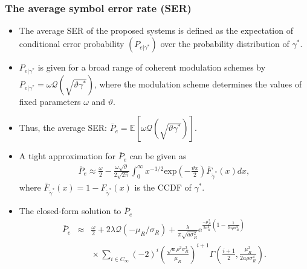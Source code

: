 \documentclass[article,mathserif,10pt,envcountsect]{beamer}
\newcommand{\E}[2][]{\mathbb{E}_{#1}\!\left[{#2}\right]}
\renewcommand{\exp}[1]{\mathrm{e}^{#1}}
\newcommand{\Exp}[1]{\mathrm{exp}\left(#1\right)}
\begin{document}
\begin{frame}
\frametitle{The average symbol error rate (SER)}
\begin{itemize}
	\item The average SER of the proposed systems is defined as the expectation of  conditional error probability $(P_{e|\gamma^*})$ over the  probability distribution of $\gamma^*$.
	
	\item  $P_{e|\gamma^*}$ is given for a broad range of coherent modulation schemes by $P_{e|\gamma^*} = \omega \mathcal{Q}\left(\sqrt{\vartheta \gamma^*}\right)$, where the modulation scheme determines the values of fixed  parameters $\omega$ and $\vartheta$.
	
	\item Thus, the average SER:  $\bar{P}_e= \E{\omega \mathcal{Q}\left(\sqrt{\vartheta \gamma^*}\right)}$.
	
	\item A tight approximation for $\bar{P}_e$ can be given as 
	\begin{eqnarray}\label{eqn:ser_cdf}
	\bar{P}_e \approx \frac{\omega}{2} - \frac{\omega \sqrt{\vartheta}}{2 \sqrt{2 \pi}} \int_{0}^{\infty} x^{-1/2} \Exp{-\frac{\vartheta x}{2}} \bar{F}_{\tilde{\gamma}^*}(x) dx, \nonumber
	\end{eqnarray} 
	where $\bar{F}_{\tilde{\gamma}^*}(x)=1-F_{\tilde{\gamma}^*}(x)$ is the CCDF of $\gamma^*$.
	
	\item The closed-form solution to $\bar{P}_e $ 
	\begin{eqnarray}\label{eqn:ser_ana}
	\!\!\!\!\!\bar{P}_e \!&\approx&\! \frac{\omega}{2} \!+\! 2\lambda \mathcal{Q}\left(-\mu_R/\sigma_{R}\right) \!+\! \frac{\lambda}{\pi \sqrt{a \sigma_{R}^2}} \exp{\frac{-\mu_R^2}{2\sigma_{R}^2}\left(1-\frac{1}{2a\rho \sigma_{R}^2}\right)} \nonumber \\
	&&\!\!\!\!\!\!\!\!\! \times \! \sum\nolimits_{i \in C_{\infty}} (-2)^i \left(\frac{\sqrt{a} \rho^2 \sigma_{R}^2}{\mu_R}\right)^{i+1} \Gamma\left(\frac{i+1}{2}, \frac{\mu_R^2}{2a\rho \sigma_{R}^4}\right). \nonumber
	\end{eqnarray}
	
\end{itemize}

\end{frame}
\end{document}
